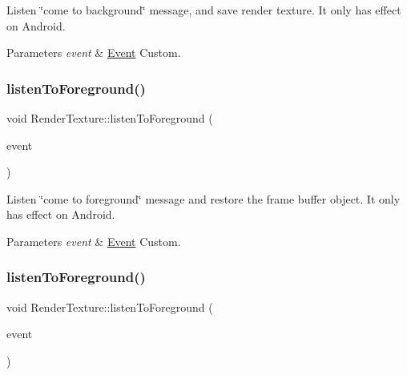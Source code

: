 Listen \char`\"{}come to background\char`\"{} message, and save render texture. It only has effect on Android.


\begin{DoxyParams}{Parameters}
{\em event} & \hyperlink{classEvent}{Event} Custom. \\
\hline
\end{DoxyParams}
\mbox{\label{classRenderTexture_adb9d5534da000cff4d4402f5049dfa11}} 
\subsubsection{\texorpdfstring{listen\+To\+Foreground()}{listenToForeground()}\hspace{0.1cm}{\footnotesize\ttfamily [1/2]}}
{\footnotesize\ttfamily void Render\+Texture\+::listen\+To\+Foreground (\begin{DoxyParamCaption}\item[{\hyperlink{classEventCustom}{Event\+Custom} $\ast$}]{event }\end{DoxyParamCaption})}

Listen \char`\"{}come to foreground\char`\"{} message and restore the frame buffer object. It only has effect on Android.


\begin{DoxyParams}{Parameters}
{\em event} & \hyperlink{classEvent}{Event} Custom. \\
\hline
\end{DoxyParams}
\mbox{\label{classRenderTexture_adb9d5534da000cff4d4402f5049dfa11}} 
\subsubsection{\texorpdfstring{listen\+To\+Foreground()}{listenToForeground()}\hspace{0.1cm}{\footnotesize\ttfamily [2/2]}}
{\footnotesize\ttfamily void Render\+Texture\+::listen\+To\+Foreground (\begin{DoxyParamCaption}\item[{\hyperlink{classEventCustom}{Event\+Custom} $\ast$}]{event }\end{DoxyParamCaption})}

